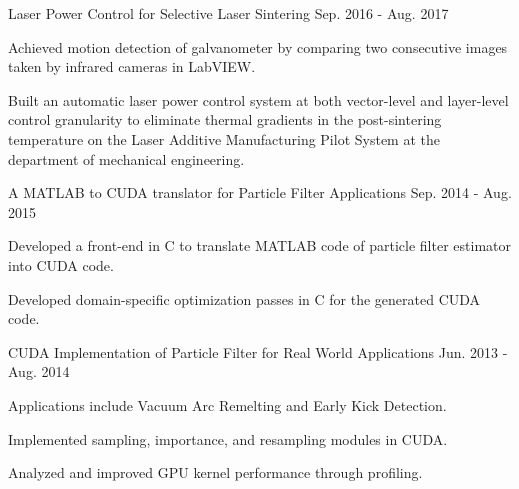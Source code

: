 \begin{cventries}
  \cvresearchentry
  {Laser Power Control for Selective Laser Sintering} %
  {Sep. 2016 - Aug. 2017} %
  {%
    \begin{cvitems}
    \item Achieved motion detection of galvanometer
      by comparing two consecutive images taken by infrared cameras in LabVIEW.
    \item Built an automatic laser power control system at both vector-level
      and layer-level control granularity to eliminate thermal
      gradients in the post-sintering temperature on the Laser Additive
      Manufacturing Pilot System at the department of mechanical engineering.
    \end{cvitems}
  }

  \cvresearchentry
  {A MATLAB to CUDA translator for Particle Filter Applications} %
  {Sep. 2014 - Aug. 2015} %
  {%
    \begin{cvitems}
    \item Developed a front-end in C to translate MATLAB code of particle filter
      estimator into CUDA code.
    \item Developed domain-specific optimization passes in C for the generated
      CUDA code.
    \end{cvitems}
  }

  \cvresearchentry
  {CUDA Implementation of Particle Filter for Real World Applications} %
  {Jun. 2013 - Aug. 2014} %
  {%
    \begin{cvitems}
    \item Applications include Vacuum Arc Remelting and Early Kick Detection.
    \item Implemented sampling, importance, and resampling modules in CUDA.
    \item Analyzed and improved GPU kernel performance through profiling.
    \end{cvitems}
  }

  
\end{cventries}